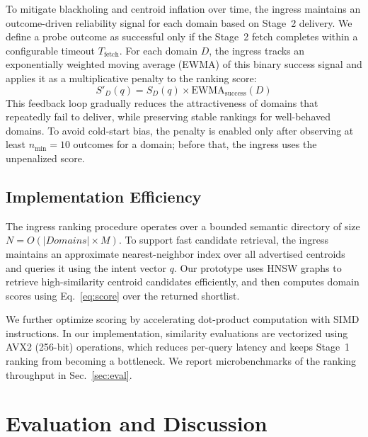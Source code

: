 \documentclass[conference]{IEEEtran}
\begin{document}
To mitigate blackholing and centroid inflation over time, the ingress maintains an outcome-driven reliability signal for each domain based on Stage~2 delivery.
We define a probe outcome as successful only if the Stage~2 fetch completes within a configurable timeout $T_{\text{fetch}}$.
For each domain $D$, the ingress tracks an exponentially weighted moving average (EWMA) of this binary success signal and applies it as a multiplicative penalty to the ranking score:
\begin{equation}
    S'_D(q) = S_D(q) \times \text{EWMA}_{\text{success}}(D)
\end{equation}
This feedback loop gradually reduces the attractiveness of domains that repeatedly fail to deliver, while preserving stable rankings for well-behaved domains.
To avoid cold-start bias, the penalty is enabled only after observing at least $n_{\min}=10$ outcomes for a domain; before that, the ingress uses the unpenalized score.

\subsection{Implementation Efficiency}
\label{sec:spec_impl}

The ingress ranking procedure operates over a bounded semantic directory of size $N = O(|Domains| \times M)$.
To support fast candidate retrieval, the ingress maintains an approximate nearest-neighbor index over all advertised centroids and queries it using the intent vector $q$.
Our prototype uses HNSW graphs to retrieve high-similarity centroid candidates efficiently, and then computes domain scores using Eq.~\ref{eq:score} over the returned shortlist.

We further optimize scoring by accelerating dot-product computation with SIMD instructions.
In our implementation, similarity evaluations are vectorized using AVX2 (256-bit) operations, which reduces per-query latency and keeps Stage~1 ranking from becoming a bottleneck.
We report microbenchmarks of the ranking throughput in Sec.~\ref{sec:eval}.


\section{Evaluation and Discussion}

\newpage
\end{document}

